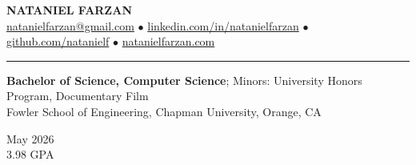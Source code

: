 \documentclass[letter]{article}
\begin{document}
    \begin{center}
        {\huge \textbf{\uppercase{Nataniel Farzan}}} \\
        \href{mailto:natanielfarzan@gmail.com}{natanielfarzan@gmail.com} $\bullet$
        \href{https://www.linkedin.com/in/natanielfarzan}{linkedin.com/in/natanielfarzan} $\bullet$
        \href{https://github.com/natanielf}{github.com/natanielf} $\bullet$
        \href{https://natanielfarzan.com/}{natanielfarzan.com}
    \end{center}

    \vspace{4pt}
    \hrule height 1pt
    \vspace{4pt}
    \noindent
    \begin{minipage}[c]{0.89\linewidth}
        \noindent \textbf{Bachelor of Science, Computer Science}; Minors: University Honors Program, Documentary Film \\
        \noindent Fowler School of Engineering, Chapman University, Orange, CA \\
    \end{minipage}
    \begin{minipage}[c]{0.10\linewidth}
        \vspace*{-\baselineskip}
        \begin{flushright}
            May 2026 \\
            3.98 GPA \\
        \end{flushright}
    \end{minipage}
\end{document}
